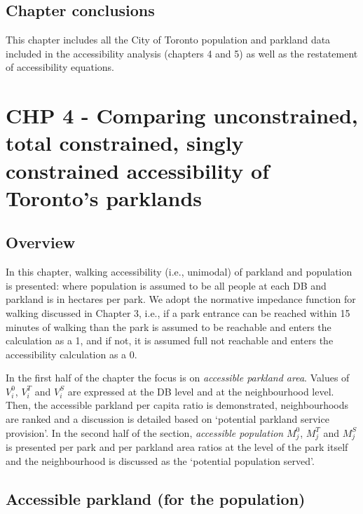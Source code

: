 \documentclass[
11pt, %
oneside, %
english, %
singlespacing, %
]{macthesis} %
\begin{document}
\section{Chapter conclusions}\label{chapter-conclusions-1}

This chapter includes all the City of Toronto population and parkland data included in the accessibility analysis (chapters 4 and 5) as well as the restatement of accessibility equations.

\chapter{CHP 4 - Comparing unconstrained, total constrained, singly constrained accessibility of Toronto's parklands}\label{chp-4---comparing-unconstrained-total-constrained-singly-constrained-accessibility-of-torontos-parklands}

\section{Overview}\label{overview-1}

In this chapter, walking accessibility (i.e., unimodal) of parkland and population is presented: where population is assumed to be all people at each DB and parkland is in hectares per park. We adopt the normative impedance function for walking discussed in Chapter 3, i.e., if a park entrance can be reached within 15 minutes of walking than the park is assumed to be reachable and enters the calculation as a 1, and if not, it is assumed full not reachable and enters the accessibility calculation as a 0.

In the first half of the chapter the focus is on \emph{accessible parkland area}. Values of \(V^0_i\), \(V^T_i\) and \(V^S_i\) are expressed at the DB level and at the neighbourhood level. Then, the accessible parkland per capita ratio is demonstrated, neighbourhoods are ranked and a discussion is detailed based on `potential parkland service provision'. In the second half of the section, \emph{accessible population} \(M^0_j\), \(M^T_j\) and \(M^S_j\) is presented per park and per parkland area ratios at the level of the park itself and the neighbourhood is discussed as the `potential population served'.

\section{Accessible parkland (for the population)}\label{accessible-parkland-for-the-population}
\end{document}
